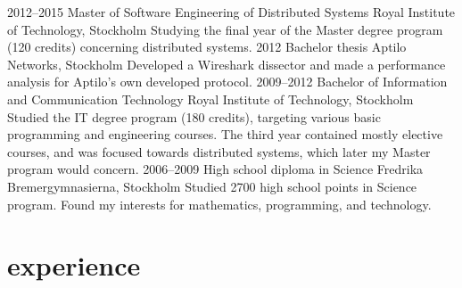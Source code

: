 \documentclass[]{friggeri-cv} %
\begin{document}
\begin{entrylist}
\entry
{2012--2015}
{Master {\normalfont of Software Engineering of Distributed Systems}}
{Royal Institute of Technology, Stockholm}
{Studying the final year of the Master degree program (120 credits) concerning distributed systems.}
\entry
{2012}
{Bachelor {\normalfont thesis}}
{Aptilo Networks, Stockholm}
{Developed a Wireshark dissector and made a performance analysis for Aptilo's own developed protocol.}
\entry
{2009--2012}
{Bachelor {\normalfont of Information and Communication Technology}}
{Royal Institute of Technology, Stockholm}
{Studied the IT degree program (180 credits), targeting various basic programming and engineering courses. The third year contained mostly elective courses, and was focused towards distributed systems, which later my Master program would concern.}
\entry
{2006--2009}
{High school diploma {\normalfont in Science}}
{Fredrika Bremergymnasierna, Stockholm}
{Studied 2700 high school points in Science program. Found my interests for mathematics, programming, and technology.}
\end{entrylist}


\section{experience}
\end{document}
